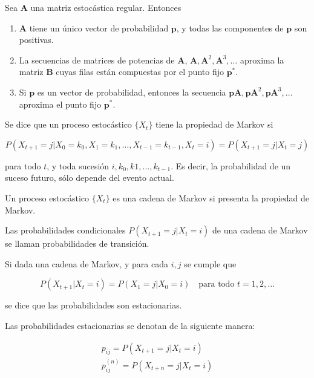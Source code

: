 \begin{teo}
Sea $\mathbf{A}$ una matriz estocástica regular. Entonces

\begin{enumerate}
\item $\mathbf{A}$ tiene un único vector de probabilidad $\mathbf{p}$, y todas las componentes de $\mathbf{p}$ son positivas.
\item La secuencias de matrices de potencias de $\mathbf{A}$, $\mathbf{A},\mathbf{A}^2,\mathbf{A}^3,\dots$ aproxima la matriz $\mathbf{B}$ cuyas filas están compuestas por el punto fijo $\mathbf{p}^*$.
\item Si $\mathbf{p}$ es un vector de probabilidad, entonces la secuencia $\mathbf{p A}, \mathbf{p} \mathbf{A}^2,\mathbf{p} \mathbf{A}^3,\dots$ aproxima el punto fijo $\mathbf{p}^*$.
\end{enumerate}
\end{teo}

\begin{defi}
Se dice que un proceso estocástico $\{X_t\}$ tiene la propiedad de Markov si 

\[ P(X_{t+1} = j | X_0 = k_0, X_1 = k_1,\dots, X_{t-1} = k_{t-1}, X_t = i) = P(X_{t+1} = j | X_t = j)\]

para todo $t$, y toda sucesión $i, k_0, k1, \dots, k_{t-1}$. Es decir, la probabilidad de un suceso futuro, sólo depende del evento actual. 
\end{defi}

\begin{defi}
Un proceso estocástico $\{X_t\}$ es una cadena de Markov si presenta la propiedad de Markov.
\end{defi}

\begin{defi}
Las probabilidades condicionales $P(X_{t+1} = j | X_t = i)$ de una cadena de Markov se llaman probabilidades de transición.
\end{defi}

\begin{defi}
Si dada una cadena de Markov, y para cada $i, j$ se cumple que 

\[ P(X_{t+1} | X_t = i) = P(X_1 = j | X_0 = i) \quad \text{para todo $t=1,2,...$} \]

se dice que las probabilidades son estacionarias.
\end{defi}

Las probabilidades estacionarias se denotan de la siguiente manera:

\begin{eqnarray}
p_{ij} = P(X_{t+1} = j | X_t = i)\\
p_{ij}^{(n)} = P(X_{t+n} = j | X_t = i)
\end{eqnarray}


